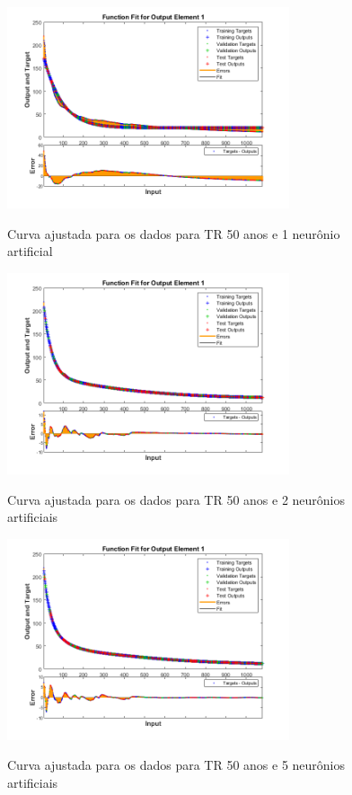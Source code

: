 \begin{figure}[H]
    \caption{Curva ajustada para os dados para TR 50 anos e 1 neurônio artificial}
    \centering
    \includegraphics[width=0.74\textwidth]{Textuais/Figuras/NN/tr50-1neuronio.png}
    \label{fig:tr50-1n}
\end{figure}

\begin{figure}[H]
    \caption{Curva ajustada para os dados para TR 50 anos e 2 neurônios artificiais}
    \centering
    \includegraphics[width=0.74\textwidth]{Textuais/Figuras/NN/tr50-2neuronio.png}
    \label{fig:tr50-2n}
\end{figure}

\begin{figure}[H]
    \caption{Curva ajustada para os dados para TR 50 anos e 5 neurônios artificiais}
    \centering
    \includegraphics[width=0.74\textwidth]{Textuais/Figuras/NN/tr50-5neuronio.png}
    \label{fig:tr50-5n}
\end{figure}

